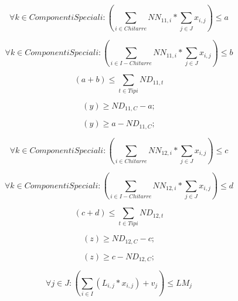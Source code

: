 \begin{equation} 
\label{vinc3}
\forall k \in ComponentiSpeciali : \left ( \sum_{i\in Chitarre} NN_{11,i}* \sum_{j\in J} x_{i,j} \right) \le a
\end{equation}

\begin{equation} 
\label{vinc4}
\forall k \in ComponentiSpeciali : \left ( \sum_{i\in I-Chitarre} NN_{11,i}* \sum_{j\in J} x_{i,j} \right) \le b
\end{equation}

\begin{equation} 
\label{vinc5}
\left ( a+b \right) \le \sum_{t\in Tipi} ND_{11,t}
\end{equation}

\begin{equation} 
\label{vinc6}
\left( y \right) \ge ND_{11,C}-a;
\end{equation}

\begin{equation} 
\label{vinc7}
\left( y \right) \ge a-ND_{11,C};
\end{equation}

\begin{equation} 
\label{vinc8}
\forall k \in ComponentiSpeciali : \left ( \sum_{i\in Chitarre} NN_{12,i}* \sum_{j\in J} x_{i,j} \right) \le c
\end{equation}

\begin{equation} 
\label{vinc9}
\forall k \in ComponentiSpeciali : \left ( \sum_{i\in I-Chitarre} NN_{12,i}* \sum_{j\in J} x_{i,j} \right) \le d
\end{equation}

\begin{equation} 
\label{vinc10}
\left ( c+d \right) \le \sum_{t\in Tipi} ND_{12,t}
\end{equation}

\begin{equation} 
\label{vinc11}
\left( z \right) \ge ND_{12,C}-c;
\end{equation}

\begin{equation} 
\label{vinc12}
\left( z \right) \ge c-ND_{12,C};
\end{equation}

\begin{equation} 
\label{vinc13}
\forall j \in J : \left ( \sum_{i\in I} (L_{i,j}*x_{i,j}) + v_j \right) \le LM_j
\end{equation}

